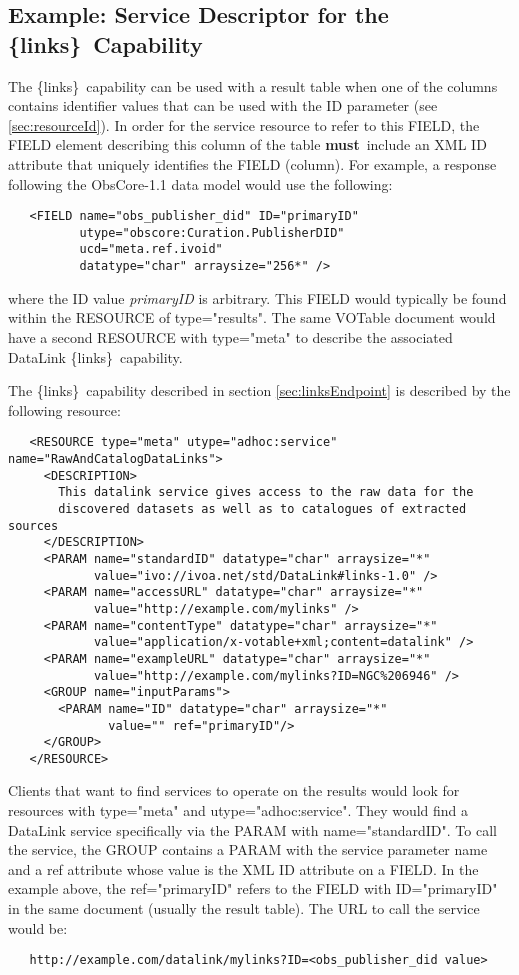 \documentclass[11pt,a4paper]{ivoa}
\newcommand{\blinks}{\{links\}}
\newcommand{\attval}[2]{#1={\allowbreak}{"}#2{"}}
\newcommand{\rfcmust}{\textbf{must}}
\begin{document}
\subsection{Example: Service Descriptor for the \blinks\ Capability}

The \blinks\ capability can be used with a result table when one of the
columns contains identifier values that can be used with the ID parameter
(see \ref{sec:resourceId}).
In order for the service resource to refer to this FIELD,
the FIELD element describing this column of the table
\rfcmust\ include an XML ID attribute
that uniquely identifies the FIELD (column).
For example, a response following the ObsCore-1.1 data model
would use the following:
\begin{verbatim}
   <FIELD name="obs_publisher_did" ID="primaryID"
          utype="obscore:Curation.PublisherDID"
          ucd="meta.ref.ivoid"
          datatype="char" arraysize="256*" />
\end{verbatim}
where the ID value {\em primaryID\/} is arbitrary.
This FIELD would typically
be found within the RESOURCE of \attval{type}{results}. The same VOTable
document would have a second RESOURCE with \attval{type}{meta} to describe
the associated DataLink \blinks\ capability.

The \blinks\ capability described in section \ref{sec:linksEndpoint}
is described by the following resource:
\begin{verbatim}
   <RESOURCE type="meta" utype="adhoc:service" name="RawAndCatalogDataLinks">
     <DESCRIPTION>
       This datalink service gives access to the raw data for the
       discovered datasets as well as to catalogues of extracted sources
     </DESCRIPTION>
     <PARAM name="standardID" datatype="char" arraysize="*"
            value="ivo://ivoa.net/std/DataLink#links-1.0" />
     <PARAM name="accessURL" datatype="char" arraysize="*"
            value="http://example.com/mylinks" />
     <PARAM name="contentType" datatype="char" arraysize="*" 
            value="application/x-votable+xml;content=datalink" />
     <PARAM name="exampleURL" datatype="char" arraysize="*" 
            value="http://example.com/mylinks?ID=NGC%206946" />       
     <GROUP name="inputParams">
       <PARAM name="ID" datatype="char" arraysize="*"
              value="" ref="primaryID"/>
     </GROUP>
   </RESOURCE>
\end{verbatim}

Clients that want to find services to operate on the results would look
for resources with \attval{type}{meta} and \attval{utype}{adhoc:service}.
They would find a DataLink service specifically via the PARAM with
\attval{name}{standardID}. To call the service, the GROUP contains a PARAM
with the service parameter name and a ref attribute whose value is the
XML ID attribute on a FIELD. In the example above, the \attval{ref}{primaryID}
refers to the FIELD with \attval{ID}{primaryID} in the same document (usually
the result table). The URL to call the service would be:
\begin{verbatim}
   http://example.com/datalink/mylinks?ID=<obs_publisher_did value>
\end{verbatim}
\end{document}
